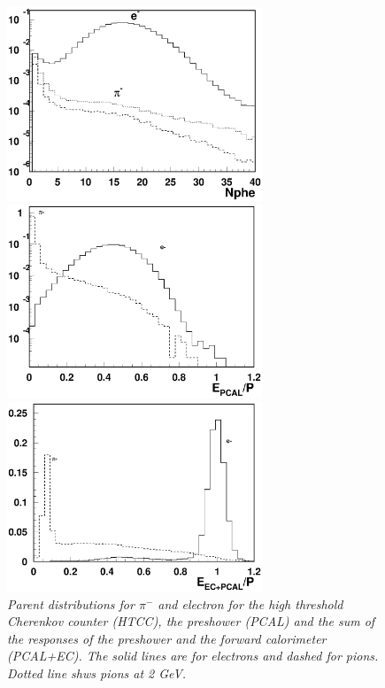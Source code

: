 \begin{figure}[htb]
\begin{minipage}[b]{5.0cm}
   \includegraphics[width=3in]{pid/htccvlas.eps} 
   \end{minipage}
   \begin{minipage}[b]{5.0cm}
 \includegraphics[width=3in]{pid/parentNormPCAL.eps}
 	\end{minipage}
	\begin{minipage}[b]{5.0cm}
	\includegraphics[width=3in]{pid/parentNormECPCAL.eps}
	\end{minipage}
	\caption{\it Parent distributions for $\pi^-$ and electron for the high 
threshold Cherenkov counter (HTCC), the preshower (PCAL) and the sum
of the responses of the preshower and the forward calorimeter (PCAL+EC). The solid lines
are for electrons and dashed for pions. Dotted line shws pions at 2 GeV.
}
\label{fig:parent1}
 \end{figure}



